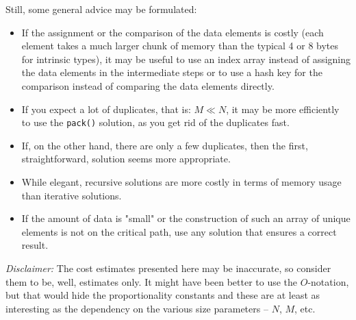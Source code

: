 \documentclass[onecolumn]{article}
\begin{document}
Still, some general advice may be formulated:
\begin{itemize}
\item
If the assignment or the comparison of the data elements is costly (each element takes a much larger
chunk of memory than the typical 4 or 8 bytes for intrinsic types), it may be useful to use an
index array instead of assigning the data elements in the intermediate steps or to use a hash key
for the comparison instead of comparing the data elements directly.
\item
If you expect a lot of duplicates, that is: $M \ll N$, it may be more efficiently to use the
\verb+pack()+ solution, as you get rid of the duplicates fast.
\item
If, on the other hand, there are only a few duplicates, then the first, straightforward, solution
seems more appropriate.
\item
While elegant, recursive solutions are more costly in terms of memory usage than iterative solutions.
\item
If the amount of data is "small" or the construction of such an array of unique elements is not
on the critical path, use any solution that ensures a correct result.
\end{itemize}

\emph{Disclaimer:} The cost estimates presented here may be inaccurate, so consider them to be,
well, estimates only. It might have been better to use the $O$-notation, but that would hide
the proportionality constants and these are at least as interesting as the dependency on the
various size parameters -- $N$, $M$, etc.
\end{document}
